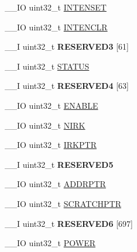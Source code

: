 \begin{DoxyCompactItemize}
\item 
\+\_\+\+\_\+\+I\+O uint32\+\_\+t \hyperlink{struct_n_r_f___a_a_r___type_a9570d15a4b66334919a119978d4664b7}{I\+N\+T\+E\+N\+S\+E\+T}
\item 
\+\_\+\+\_\+\+I\+O uint32\+\_\+t \hyperlink{struct_n_r_f___a_a_r___type_aaaeea273b7ab5eba7d9d9c6de38087c2}{I\+N\+T\+E\+N\+C\+L\+R}
\item 
\hypertarget{struct_n_r_f___a_a_r___type_ab941809aec2a6953f09f1a70f108af5a}{}\+\_\+\+\_\+\+I uint32\+\_\+t {\bfseries R\+E\+S\+E\+R\+V\+E\+D3} \mbox{[}61\mbox{]}\label{struct_n_r_f___a_a_r___type_ab941809aec2a6953f09f1a70f108af5a}

\item 
\+\_\+\+\_\+\+I uint32\+\_\+t \hyperlink{struct_n_r_f___a_a_r___type_a6370050a6b5e86260a134aa68badaa78}{S\+T\+A\+T\+U\+S}
\item 
\hypertarget{struct_n_r_f___a_a_r___type_a70f328fec6f9fa8b91f6d256d759bbc4}{}\+\_\+\+\_\+\+I uint32\+\_\+t {\bfseries R\+E\+S\+E\+R\+V\+E\+D4} \mbox{[}63\mbox{]}\label{struct_n_r_f___a_a_r___type_a70f328fec6f9fa8b91f6d256d759bbc4}

\item 
\+\_\+\+\_\+\+I\+O uint32\+\_\+t \hyperlink{struct_n_r_f___a_a_r___type_a084c70b53c6c9eb98bf30a0d92397cf6}{E\+N\+A\+B\+L\+E}
\item 
\+\_\+\+\_\+\+I\+O uint32\+\_\+t \hyperlink{struct_n_r_f___a_a_r___type_abdbd58c3b3463816ac1a78fb80c1b1c9}{N\+I\+R\+K}
\item 
\+\_\+\+\_\+\+I\+O uint32\+\_\+t \hyperlink{struct_n_r_f___a_a_r___type_a71ff34c1e88a616c5f05cebeca7c7889}{I\+R\+K\+P\+T\+R}
\item 
\hypertarget{struct_n_r_f___a_a_r___type_ab2ecd8908371ee6fa8e4257b6f25d45b}{}\+\_\+\+\_\+\+I uint32\+\_\+t {\bfseries R\+E\+S\+E\+R\+V\+E\+D5}\label{struct_n_r_f___a_a_r___type_ab2ecd8908371ee6fa8e4257b6f25d45b}

\item 
\+\_\+\+\_\+\+I\+O uint32\+\_\+t \hyperlink{struct_n_r_f___a_a_r___type_a8ef23eb9ee750b954e2707f402f62257}{A\+D\+D\+R\+P\+T\+R}
\item 
\+\_\+\+\_\+\+I\+O uint32\+\_\+t \hyperlink{struct_n_r_f___a_a_r___type_a47c5daf494f9af97819643464d8455bc}{S\+C\+R\+A\+T\+C\+H\+P\+T\+R}
\item 
\hypertarget{struct_n_r_f___a_a_r___type_ab6b86890cc098f1e6ecec868c6370fb8}{}\+\_\+\+\_\+\+I uint32\+\_\+t {\bfseries R\+E\+S\+E\+R\+V\+E\+D6} \mbox{[}697\mbox{]}\label{struct_n_r_f___a_a_r___type_ab6b86890cc098f1e6ecec868c6370fb8}

\item 
\+\_\+\+\_\+\+I\+O uint32\+\_\+t \hyperlink{struct_n_r_f___a_a_r___type_a6b04afc96126c1b7aa83353081fd596b}{P\+O\+W\+E\+R}
\end{DoxyCompactItemize}


